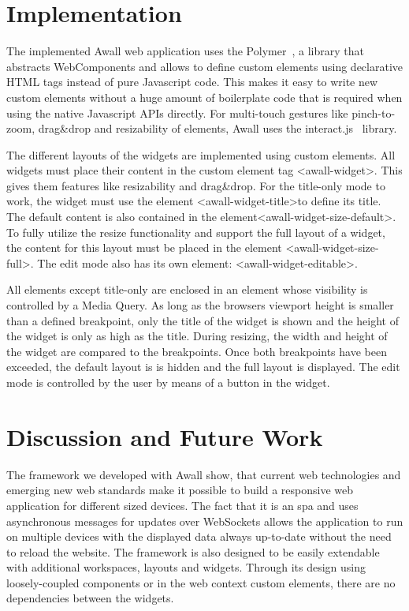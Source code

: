 \documentclass{sigchi}
\begin{document}
\section{Implementation}
The implemented Awall web application uses the Polymer~\cite{polymer}, a library that abstracts WebComponents and allows to define custom elements using declarative HTML tags instead of pure Javascript code.
This makes it easy to write new custom elements without a huge amount of boilerplate code that is required when using the native Javascript APIs directly.
For multi-touch gestures like pinch-to-zoom, drag\&drop and resizability of elements, Awall uses the interact.js~\cite{interactJs} library.

The different layouts of the widgets are implemented using custom elements.
All widgets must place their content in the custom element tag \textless{}awall-widget\textgreater.
This gives them features like resizability and drag\&drop.
For the title-only mode to work, the widget must use the element \textless{}awall-widget-title\textgreater to define its title.
The default content is also contained in the element\textless{}awall-widget-size-default\textgreater.
To fully utilize the resize functionality and support the full layout of a widget, the content for this layout must be placed in the element \textless{}awall-widget-size-full\textgreater.
The edit mode also has its own element: \textless{}awall-widget-editable\textgreater.
 
All elements except title-only are enclosed in an element whose visibility is controlled by a Media Query.
As long as the browsers viewport height is smaller than a defined breakpoint, only the title of the widget is shown and the height of the widget is only as high as the title.
During resizing, the width and height of the widget are compared to the breakpoints.
Once both breakpoints have been exceeded, the default layout is is hidden and the full layout is displayed.
The edit mode is controlled by the user by means of a button in the widget.


\section{Discussion and Future Work}

The framework we developed with Awall show, that current web technologies and emerging new web standards make it possible to build a responsive web application for different sized devices. 
The fact that it is an \gls{spa} and uses asynchronous messages for updates over WebSockets allows the application to run on multiple devices with the displayed data always up-to-date without the need to reload the website.
The framework is also designed to be easily extendable with additional workspaces, layouts and widgets.
Through its design using loosely-coupled components or in the web context custom elements, there are no dependencies between the widgets.
\end{document}
